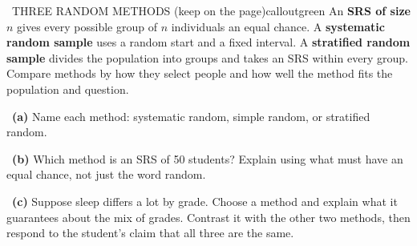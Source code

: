 \documentclass[11pt]{article}
\begin{document}
\begin{callout}{\IconBook\ THREE RANDOM METHODS (keep on the page)}{calloutgreen}
An \textbf{SRS of size $n$} gives every possible group of $n$ individuals an equal chance. A \textbf{systematic random sample} uses a random start and a fixed interval. A \textbf{stratified random sample} divides the population into groups and takes an SRS within every group. Compare methods by how they select people and how well the method fits the population and question.
\end{callout}

~\textbf{(a)} Name each method: systematic random, simple random, or stratified random.\par
{}

~\textbf{(b)} Which method is an SRS of 50 students? Explain using what must have an equal chance, not just the word random.\par
{}

~\textbf{(c)} Suppose sleep differs a lot by grade. Choose a method and explain what it guarantees about the mix of grades. Contrast it with the other two methods, then respond to the student's claim that all three are the same.\par
{}
\end{document}
